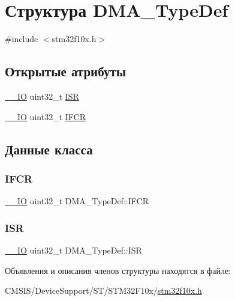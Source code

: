 \hypertarget{struct_d_m_a___type_def}{}\section{Структура D\+M\+A\+\_\+\+Type\+Def}
\label{struct_d_m_a___type_def}


{\ttfamily \#include $<$stm32f10x.\+h$>$}

\subsection*{Открытые атрибуты}
\begin{DoxyCompactItemize}
\item 
\mbox{\hyperlink{group___c_m_s_i_s___c_m3__core__definitions_gaec43007d9998a0a0e01faede4133d6be}{\+\_\+\+\_\+\+IO}} uint32\+\_\+t \mbox{\hyperlink{struct_d_m_a___type_def_aa341a859df2f59bf6c0f7a000ab8734b}{I\+SR}}
\item 
\mbox{\hyperlink{group___c_m_s_i_s___c_m3__core__definitions_gaec43007d9998a0a0e01faede4133d6be}{\+\_\+\+\_\+\+IO}} uint32\+\_\+t \mbox{\hyperlink{struct_d_m_a___type_def_a30576220ca1968e61666d92092e8911e}{I\+F\+CR}}
\end{DoxyCompactItemize}


\subsection{Данные класса}
\mbox{\label{struct_d_m_a___type_def_a30576220ca1968e61666d92092e8911e}} 
\subsubsection{\texorpdfstring{IFCR}{IFCR}}
{\footnotesize\ttfamily \mbox{\hyperlink{group___c_m_s_i_s___c_m3__core__definitions_gaec43007d9998a0a0e01faede4133d6be}{\+\_\+\+\_\+\+IO}} uint32\+\_\+t D\+M\+A\+\_\+\+Type\+Def\+::\+I\+F\+CR}

\mbox{\label{struct_d_m_a___type_def_aa341a859df2f59bf6c0f7a000ab8734b}} 
\subsubsection{\texorpdfstring{ISR}{ISR}}
{\footnotesize\ttfamily \mbox{\hyperlink{group___c_m_s_i_s___c_m3__core__definitions_gaec43007d9998a0a0e01faede4133d6be}{\+\_\+\+\_\+\+IO}} uint32\+\_\+t D\+M\+A\+\_\+\+Type\+Def\+::\+I\+SR}



Объявления и описания членов структуры находятся в файле\+:\begin{DoxyCompactItemize}
\item 
C\+M\+S\+I\+S/\+Device\+Support/\+S\+T/\+S\+T\+M32\+F10x/\mbox{\hyperlink{stm32f10x_8h}{stm32f10x.\+h}}\end{DoxyCompactItemize}
